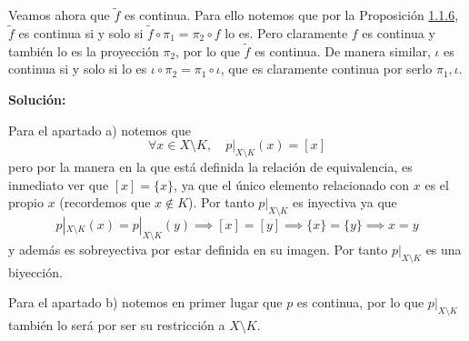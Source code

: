 {    Veamos ahora que $\tilde{f}$ es continua. Para ello notemos que por la Proposición \hyperref[prop:116]{1.1.6}, $\tilde{f}$ es continua si y solo si $\tilde{f}\circ\pi_1=\pi_2\circ f$ lo es. Pero claramente $f$ es continua y también lo es la proyección $\pi_2$, por lo que $\tilde{f}$ es continua. De manera similar, $\iota$ es continua si y solo si lo es $\iota\circ\pi_2=\pi_1\circ\iota$, que es claramente continua por serlo $\pi_1, \iota$.

}

\clearpage




\noindent\textbf{Solución:}

Para el apartado a) notemos que
\[
    \forall x \in X \setminus K,\quad p|_{X\setminus K}(x)=[x]
\]
pero por la manera en la que está definida la relación de equivalencia, es inmediato ver que $[x]=\{x\}$, ya que el único elemento relacionado con $x$ es el propio $x$ (recordemos que $x\notin K$). Por tanto $p|_{X\setminus K}$ es inyectiva ya que
\[
    p|_{X\setminus K}(x)=p|_{X\setminus K}(y)\implies [x]=[y]\implies \{x\}=\{y\}\implies x=y
\]
y además es sobreyectiva por estar definida en su imagen. Por tanto $p|_{X\setminus K}$ es una biyección.

Para el apartado b) notemos en primer lugar que $p$ es continua, por lo que $p|_{X\setminus K}$ también lo será por ser su restricción a $X\setminus K$.

